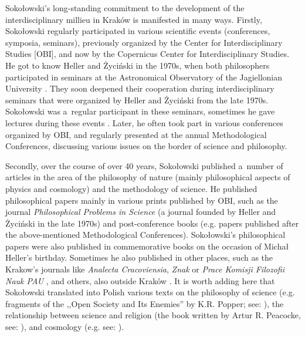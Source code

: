 \documentclass[%
  manuscript=article,
  year=2024,
  volume=77,
  doi=00000.000,
]{zfn}
\begin{document}
Sokołowski's long-standing commitment to the development of the interdisciplinary millieu in Kraków is manifested in many ways. Firstly, Sokołowski regularly participated in various scientific events (conferences, symposia, seminars), previously organized by the Center for Interdisciplinary Studies [OBI], and now by the Copernicus Center for Interdisciplinary Studies. He got to know Heller and Życiński in the 1970s, when both philosophers participated in seminars at the Astronomical Observatory of the Jagiellonian University 
\parencite[][]{Sokoowski2015Racjonalny}. %
 They soon deepened their cooperation during interdisciplinary seminars that were organized by Heller and Życiński from the late 1970s. Sokołowski was a~regular participant in these seminars, sometimes he gave lectures during these events 
\parencite[][]{Liana1999Z}. %
 Later, he often took part in various conferences organized by OBI, and regularly presented at the annual Methodological Conferences, discussing various issues on the border of science and philosophy.



Secondly, over the course of over 40 years, Sokołowski published a~number of articles in the area of the philosophy of nature (mainly philosophical aspects of physics and cosmology) and the methodology of science. He published philosophical papers mainly in various prints published by OBI, such as the journal \textit{Philosophical Problems in Science} (a journal founded by Heller and Życiński in the late 1970s) and post-conference books (e.g. papers published after the above-mentioned Methodological Conferences). Sokołowski's philosophical papers were also published in commemorative books on the occasion of Michał Heller's birthday. Sometimes he also published in other places, such as the Krakow's journals like \textit{Analecta Cracoviensia}, \textit{Znak} or \textit{Prace Komisji Filozofii Nauk PAU} 
\parencite[e.g.,][]{Sokoowski2008Uzasadnianie}, %
 and others, also outside Kraków 
\parencites[see e.g.,][]{Sokoowski1978Czy}[][]{Sokoowski1984O}[][]{Sokoowski1986Pluralizm}. %
 It is worth adding here that Sokołowski translated into Polish various texts on the philosophy of science (e.g. fragments of the ,,Open Society and Its Enemies'' by K.R. Popper; see: 
\parencite[][]{Popper1987Hegel}%
), the relationship between science and religion (the book written by Artur R. Peacocke, see: 
\parencite[][]{Peacocke1991Teologia}%
), and cosmology (e.g. see: 
\parencite[][]{Davies1996Zasada}%
).
\end{document}
